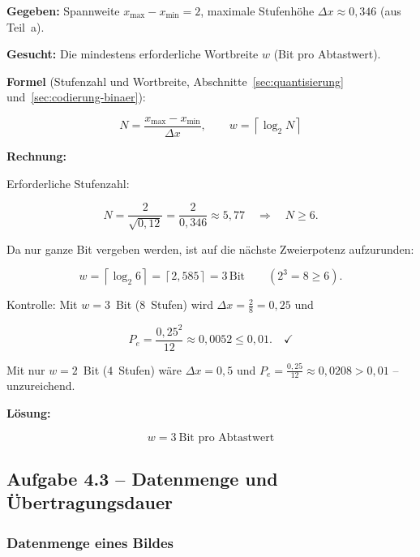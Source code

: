 \begin{beispiel}

\textbf{Gegeben:} Spannweite $x_{\max} - x_{\min} = 2$, maximale Stufenhöhe
$\Delta x \approx 0{,}346$ (aus Teil~a).

\textbf{Gesucht:} Die mindestens erforderliche Wortbreite $w$ (Bit pro
Abtastwert).

\textbf{Formel} (Stufenzahl und Wortbreite,
Abschnitte~\ref{sec:quantisierung} und~\ref{sec:codierung-binaer}):

$$
N = \frac{x_{\max} - x_{\min}}{\Delta x}, \qquad w = \left\lceil \log_2 N \right\rceil
$$

\textbf{Rechnung:}

Erforderliche Stufenzahl:

$$
N = \frac{2}{\sqrt{0{,}12}} = \frac{2}{0{,}346} \approx 5{,}77
\quad\Longrightarrow\quad N \geq 6.
$$

Da nur ganze Bit vergeben werden, ist auf die nächste Zweierpotenz aufzurunden:

$$
w = \left\lceil \log_2 6 \right\rceil = \left\lceil 2{,}585 \right\rceil = 3\,\text{Bit}
\qquad (2^3 = 8 \geq 6).
$$

Kontrolle: Mit $w = 3$~Bit ($8$~Stufen) wird
$\Delta x = \tfrac{2}{8} = 0{,}25$ und

$$
P_e = \frac{0{,}25^2}{12} \approx 0{,}0052 \leq 0{,}01. \quad\checkmark
$$

Mit nur $w = 2$~Bit ($4$~Stufen) wäre $\Delta x = 0{,}5$ und
$P_e = \tfrac{0{,}25}{12} \approx 0{,}0208 > 0{,}01$ -- unzureichend.

\textbf{Lösung:}

$$
\boxed{\;w = 3\ \text{Bit pro Abtastwert}\;}
$$

\end{beispiel}


\subsection*{Aufgabe 4.3 – Datenmenge und Übertragungsdauer}

\subsubsection*{Datenmenge eines Bildes}

